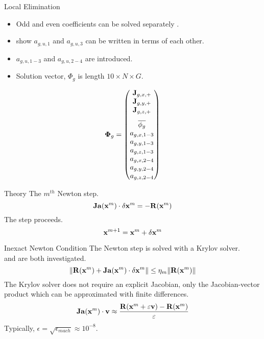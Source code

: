 \begin{frame}{Local Elimination}
  \begin{itemize}
    \item Odd and even coefficients can be solved separately \cite{gehinThesis}.
    \item \citeauthor{qe2paper} show $a_{g,u,1}$ and $a_{g,u,3}$ can be written
      in terms of each other.
    \item $a_{g,u,1-3}$ and $a_{g,u,2-4}$ are introduced.
    \item Solution vector, $\Phi_g$ is length $10 \times N \times G$.
  \end{itemize}
  \begin{equation}
    \label{eq:solution_vector}
    \vPhi_g =
    \begin{pmatrix}
      \current_{g,x,+} \\
      \current_{g,y,+} \\
      \vspace{8pt}
      \current_{g,z,+} \\
      \overline{\phi_g} \\
      a_{g,x,1-3} \\
      a_{g,y,1-3} \\
      a_{g,z,1-3} \\
      a_{g,x,2-4} \\
      a_{g,y,2-4} \\
      a_{g,z,2-4}
    \end{pmatrix}
  \end{equation}
\end{frame}

\begin{frame}{ Theory}
  The $m^{th}$ Newton step.
  \begin{equation}
    \label{eq:newton_step}
    \mathbf{Ja} (\mathbf{x}^m) \cdot \delta\mathbf{x}^m = - \mathbf{R}(\mathbf{x}^m)
  \end{equation}
  The step proceeds.
  \begin{equation}
    \mathbf{x}^{m+1} = \mathbf{x}^{m} + \delta\mathbf{x}^{m}
  \end{equation}
\end{frame}

\begin{frame}{Inexact Newton Condition}
  The Newton step is solved with a Krylov solver. \\
   and  are both investigated.
  \begin{equation}
    \label{eq:inexact_newton_condition}
    \| \mathbf{R}(\mathbf{x}^m) + \mathbf{Ja}(\mathbf{x}^m) \cdot \delta\mathbf{x}^m \| \le 
      \eta_m \| \mathbf{R}(\mathbf{x}^m) \|
  \end{equation}
  The Krylov solver does not require an explicit Jacobian, only the
  Jacobian-vector product which can be approximated with finite differences.
  \begin{equation}
    \label{eq:dirder}
    \mathbf{Ja}(\mathbf{x}^m) \cdot \mathbf{v} \approx \frac{\mathbf{R}(\mathbf{x}^m + \varepsilon \mathbf{v}) - 
      \mathbf{R}(\mathbf{x}^m)}{\varepsilon}
  \end{equation}
  Typically, $\epsilon = \sqrt{\epsilon_{mach}} \approx 10^{-8}$.
\end{frame}

